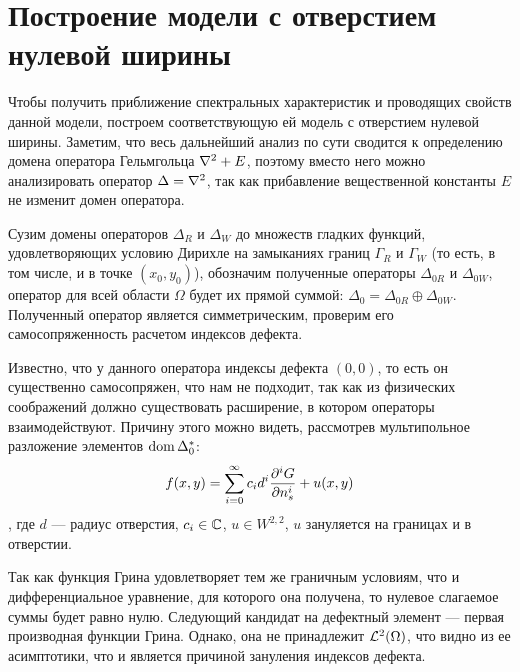 \section{Построение модели с отверстием нулевой ширины}
Чтобы получить приближение спектральных характеристик и проводящих свойств данной модели, построем соответствующую ей модель с отверстием нулевой ширины. Заметим, что весь дальнейший анализ по сути сводится к определению домена оператора Гельмгольца $\laplacian + E$, поэтому вместо него можно анализировать оператор $\Delta = \laplacian$, так как прибавление вещественной константы $E$ не изменит домен оператора.

Сузим домены операторов $\Delta_R$ и $\Delta_W$ до множеств гладких функций, удовлетворяющих условию Дирихле на замыканиях границ $\Gamma_R$ и $\Gamma_W$ (то есть, в том числе, и в точке $(x_0, y_0)$), обозначим полученные операторы $\Delta_{0R}$ и $\Delta_{0W}$, оператор для всей области $\Omega$ будет их прямой суммой: $\Delta_0 = \Delta_{0R} \oplus \Delta_{0W}$. Полученный оператор является симметрическим, проверим его самосопряженность расчетом индексов дефекта. %

Известно, что у данного оператора индексы дефекта $(0, 0)$, то есть он существенно самосопряжен, что нам не подходит, так как из физических соображений должно существовать расширение, в котором операторы взаимодействуют. Причину этого можно видеть, рассмотрев мультипольное разложение элементов $\operatorname{dom} \Delta_0^*$:
\[
f(x, y) = \sum\limits_{i = 0}^\infty c_i d^i \pdv[i]{G}{n_s} (x, y, x_0, y_0; E_0) + u(x, y)
\]
, где $d$ — радиус отверстия, $c_i \in \mathbb{C}$, $u \in W^{2, 2}$, $u$ зануляется на границах и в отверстии.


Так как функция Грина удовлетворяет тем же граничным условиям, что и дифференциальное уравнение, для которого она получена, то нулевое слагаемое суммы будет равно нулю. Следующий кандидат на дефектный элемент — первая производная функции Грина. Однако, она не принадлежит $\mathcal{L}^2(\Omega)$, что видно из ее асимптотики, что и является причиной зануления индексов дефекта.

